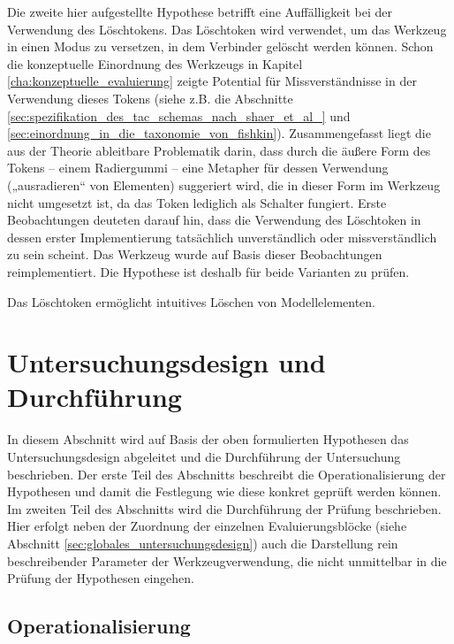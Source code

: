 Die zweite hier aufgestellte Hypothese betrifft eine Auffälligkeit bei der Verwendung des Löschtokens. Das Löschtoken wird verwendet, um das Werkzeug in einen Modus zu versetzen, in dem Verbinder gelöscht werden können. Schon die konzeptuelle Einordnung des Werkzeugs in Kapitel \ref{cha:konzeptuelle_evaluierung} zeigte Potential für Missverständnisse in der Verwendung dieses Tokens (siehe z.B. die Abschnitte \ref{sec:spezifikation_des_tac_schemas_nach_shaer_et_al_} und \ref{sec:einordnung_in_die_taxonomie_von_fishkin}). Zusammengefasst liegt die aus der Theorie ableitbare Problematik darin, dass durch die äußere Form des Tokens -- einem Radiergummi -- eine Metapher für dessen Verwendung („ausradieren“ von Elementen) suggeriert wird, die in dieser Form im Werkzeug nicht umgesetzt ist, da das Token lediglich als Schalter fungiert. Erste Beobachtungen deuteten darauf hin, dass die Verwendung des Löschtoken in dessen erster Implementierung tatsächlich unverständlich oder missverständlich zu sein scheint. Das Werkzeug wurde auf Basis dieser Beobachtungen reimplementiert. Die Hypothese ist deshalb für beide Varianten zu prüfen.

\begin{hyp}
	\label{hyp:radierer}
	Das Löschtoken ermöglicht intuitives Löschen von Modellelementen.
\end{hyp}


\section{Untersuchungsdesign und Durchführung} %
\label{sec:untersuchungsdesign}

In diesem Abschnitt wird auf Basis der oben formulierten Hypothesen das Untersuchungsdesign abgeleitet und die Durchführung der Untersuchung beschrieben. Der erste Teil des Abschnitts beschreibt die Operationalisierung der Hypothesen und damit die Festlegung wie diese konkret geprüft werden können. Im zweiten Teil des Abschnitts wird die Durchführung der Prüfung beschrieben. Hier erfolgt neben der Zuordnung der einzelnen Evaluierungsblöcke (siehe Abschnitt \ref{sec:globales_untersuchungsdesign}) auch die Darstellung rein beschreibender Parameter der Werkzeugverwendung, die nicht unmittelbar in die Prüfung der Hypothesen eingehen. 

\subsection{Operationalisierung} %
\label{sub:operationalisierung}

